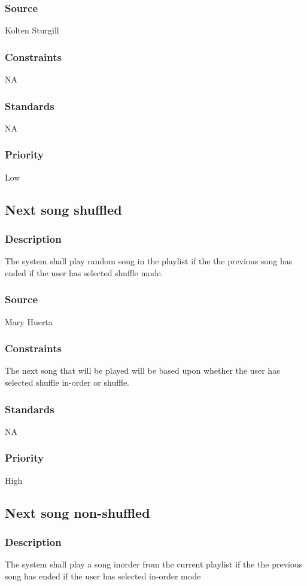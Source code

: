\subsubsection{Source}
Kolten Sturgill
\subsubsection{Constraints}
NA
\subsubsection{Standards}
NA
\subsubsection{Priority}
Low



\subsection{Next song shuffled}
\subsubsection{Description}
The system shall play random song in the playlist if the the previous song has ended if the user has selected shuffle mode.
\subsubsection{Source}
Mary Huerta
\subsubsection{Constraints}
The next song that will be played will be based upon whether the user has selected shuffle in-order or shuffle.
\subsubsection{Standards}
NA
\subsubsection{Priority}
High



\subsection{Next song non-shuffled}
\subsubsection{Description}
The system shall play a song inorder from the current playlist if the the previous song has ended if the user has selected in-order mode
